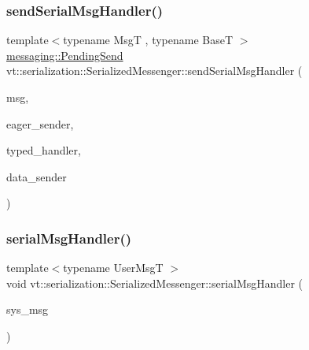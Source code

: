 \mbox{\label{structvt_1_1serialization_1_1_serialized_messenger_ad42536151cbfb8cd42e9c8431c3d58b7}} 
\subsubsection{\texorpdfstring{send\+Serial\+Msg\+Handler()}{sendSerialMsgHandler()}\hspace{0.1cm}{\footnotesize\ttfamily [2/2]}}
{\footnotesize\ttfamily template$<$typename MsgT , typename BaseT $>$ \\
\hyperlink{structvt_1_1messaging_1_1_pending_send}{messaging\+::\+Pending\+Send} vt\+::serialization\+::\+Serialized\+Messenger\+::send\+Serial\+Msg\+Handler (\begin{DoxyParamCaption}\item[{MsgT $\ast$}]{msg,  }\item[{\hyperlink{namespacevt_1_1serialization_a009aa1de8d42a3c97643b947fcc6f0b6}{Action\+Eager\+Send}$<$ MsgT, BaseT $>$}]{eager\+\_\+sender,  }\item[{\hyperlink{namespacevt_af64846b57dfcaf104da3ef6967917573}{Handler\+Type} const \&}]{typed\+\_\+handler,  }\item[{\hyperlink{namespacevt_1_1serialization_afffcac0da80b78e77ef8043dba4e814f}{Action\+Data\+Send}}]{data\+\_\+sender }\end{DoxyParamCaption})\hspace{0.3cm}{\ttfamily [static]}}

\mbox{\label{structvt_1_1serialization_1_1_serialized_messenger_aad74b93ed6e38beb26ce31d69eb85a71}} 
\subsubsection{\texorpdfstring{serial\+Msg\+Handler()}{serialMsgHandler()}}
{\footnotesize\ttfamily template$<$typename User\+MsgT $>$ \\
void vt\+::serialization\+::\+Serialized\+Messenger\+::serial\+Msg\+Handler (\begin{DoxyParamCaption}\item[{\hyperlink{structvt_1_1serialization_1_1_serialized_messenger_a279027d1664b42cf7f288dc3fc9c3014}{Serial\+Wrapper\+Msg\+Type}$<$ User\+MsgT $>$ $\ast$}]{sys\+\_\+msg }\end{DoxyParamCaption})\hspace{0.3cm}{\ttfamily [static]}}

